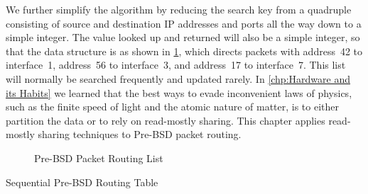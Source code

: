 We further simplify the algorithm by reducing the search key from
a quadruple consisting of source and destination IP addresses and
ports all the way down to a simple integer.
The value looked up and returned will also be a simple integer,
so that the data structure is as shown in
\cref{fig:defer:Pre-BSD Packet Routing List}, which
directs packets with address~42 to interface~1, address~56 to
interface~3, and address~17 to interface~7.
This list will normally be searched frequently and updated rarely.
In \cref{chp:Hardware and its Habits}
we learned that the best ways to evade inconvenient laws of physics, such as
the finite speed of light and the atomic nature of matter, is to
either partition the data or to rely on read-mostly sharing.
This chapter applies read-mostly sharing techniques to Pre-BSD packet
routing.

\begin{figure}
\centering
{}
\caption{Pre-BSD Packet Routing List}
\label{fig:defer:Pre-BSD Packet Routing List}
\end{figure}

\begin{listing}

\caption{Sequential Pre-BSD Routing Table}
\label{lst:defer:Sequential Pre-BSD Routing Table}
\end{listing}

